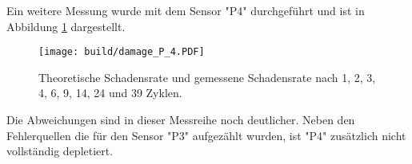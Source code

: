 Ein weitere Messung wurde mit dem Sensor "P4" durchgeführt und ist in Abbildung \ref{fig:P_4}
dargestellt.

\begin{figure}
    \texttt{[image: build/damage\_P\_4.PDF]}
\caption{Theoretische Schadensrate und gemessene Schadensrate nach 1, 2, 3, 4, 6, 9, 14, 24 und 39 Zyklen.}
\label{fig:P_4}
\end{figure}

Die Abweichungen sind in dieser Messreihe noch deutlicher. Neben den Fehlerquellen die
für den Sensor "P3" aufgezählt wurden, ist "P4" zusätzlich nicht vollständig depletiert.
